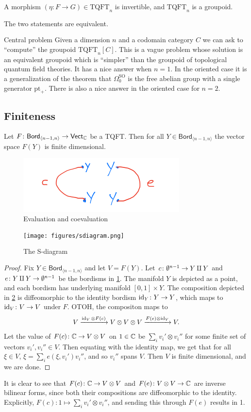 \begin{theorem}
    A morphism $(\eta \colon F \to G) \in \mathrm{TQFT}_n $ is invertible, and $\mathrm{TQFT}_n $ is a groupoid.
\end{theorem}
The two statements are equivalent.
\begin{namedthing}{Central problem} 
    Given a dimension $n$ and a codomain category $C$ we can ask to ``compute'' the groupoid  $\mathrm{TQFT}_n [C]$. This is a vague problem whose solution is an equivalent groupoid which is ``simpler'' than the groupoid of topological quantum field theories. It has a nice answer when $n=1$. In the oriented case it is a generalization of the theorem that $\Omega_0^{\mathrm{SO}}$ is the free abelian group with a single generator $\mathrm{pt}_+$. There is also a nice answer in the oriented case for $n=2$.
\end{namedthing}
\subsection{Finiteness}
\begin{prop}
    Let $F \colon \mathsf{Bord} _{\langle n-1,n \rangle } \to \mathsf{Vect_{\mathbb{C}}} $ be a TQFT. Then for all $Y \in \mathsf{Bord} _{\langle n-1,n \rangle }$ the vector space $F(Y)$ is finite dimensional.
\end{prop}
\begin{figure}[H]
\centering
 \includegraphics[width=0.3\linewidth]{figures/evcoev.png}
 \caption{Evaluation and coevaluation} 
 \label{evcoev} 
\end{figure}
\begin{figure}[H]
\centering
 \texttt{[image: figures/sdiagram.png]}
 \caption{The S-diagram} 
 \label{sdiagram} 
\end{figure}
\begin{proof}
    Fix $Y \in \mathsf{Bord} _{\langle n-1,n \rangle }$ and let $V=F(Y)$. Let  $c \colon \emptyset ^{n-1} \to Y \amalg Y$ and $e \colon Y\amalg Y \to \emptyset^{n-1}$ be the bordisms in \cref{evcoev}. The manifold $Y$ is depicted as a point, and each bordism has underlying manifold $[0,1] \times Y$. The composition depicted in \cref{sdiagram} is diffeomorphic to the identity bordism $\operatorname{id} _Y \colon Y \to Y$, which maps to $\operatorname{id}_V \colon V \to V$ under $F$. OTOH, the compositon maps to \[
        V \xrightarrow{\operatorname{id}_V \otimes F(c)} V\otimes V\otimes V\xrightarrow{F(e)\otimes \operatorname{id}_V} V.
    \] Let the value of  $F(c) \colon \mathbb{C} \to V\otimes V$ on $1 \in \mathbb{C}$ be $\sum _i  v_i '\otimes v_i ''$ for some finite set of vectors $v_i ', v_i '' \in V$. Then equating with the identity map, we get that for all $\xi \in V$, $\xi =\sum _i e(\xi ,v_i ')v_i ''$, and so $v_i ''$ spans $V.$ Then $V$ is finite dimensional, and we are done.
\end{proof}
It is clear to see that $F(c) \colon \mathbb{C} \to V\otimes V$ and $F(e) \colon V\otimes V \to \mathbb{C}$ are inverse bilinear forms, since both their compositions are diffeomorphic to the identity. Explicitly, $F(c) \colon 1 \mapsto  \sum _i  v_i '\otimes v_i ''$, and sending this through $F(e)$ results in 1.

